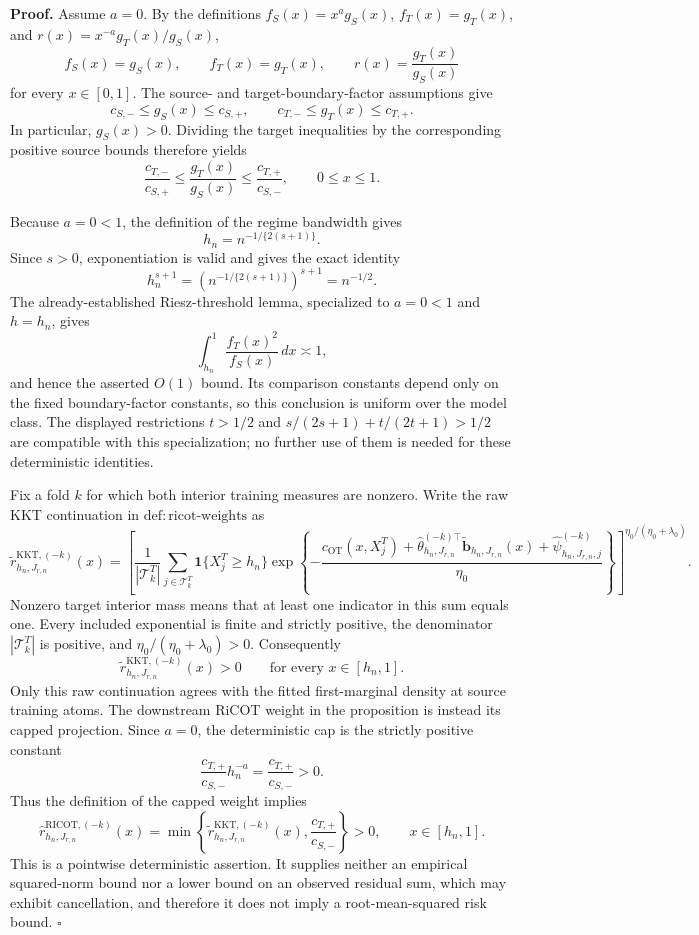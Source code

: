 \textbf{Proof.}
Assume \(a=0\). By the definitions \(f_S(x)=x^a g_S(x)\), \(f_T(x)=g_T(x)\), and \(r(x)=x^{-a}g_T(x)/g_S(x)\),
\[
f_S(x)=g_S(x),\qquad f_T(x)=g_T(x),\qquad r(x)=\frac{g_T(x)}{g_S(x)}
\]
for every \(x\in[0,1]\). The source- and target-boundary-factor assumptions give
\[
c_{S,-}\le g_S(x)\le c_{S,+},
\qquad
c_{T,-}\le g_T(x)\le c_{T,+}.
\]
In particular, \(g_S(x)>0\). Dividing the target inequalities by the corresponding positive source bounds therefore yields
\[
\frac{c_{T,-}}{c_{S,+}}
\le \frac{g_T(x)}{g_S(x)}
\le \frac{c_{T,+}}{c_{S,-}},
\qquad 0\le x\le1.
\]

Because \(a=0<1\), the definition of the regime bandwidth gives
\[
h_n=n^{-1/\{2(s+1)\}}.
\]
Since \(s>0\), exponentiation is valid and gives the exact identity
\[
h_n^{s+1}=\left(n^{-1/\{2(s+1)\}}\right)^{s+1}=n^{-1/2}.
\]
The already-established Riesz-threshold lemma, specialized to \(a=0<1\) and \(h=h_n\), gives
\[
\int_{h_n}^1\frac{f_T(x)^2}{f_S(x)}\,dx\asymp1,
\]
and hence the asserted \(O(1)\) bound. Its comparison constants depend only on the fixed boundary-factor constants, so this conclusion is uniform over the model class. The displayed restrictions \(t>1/2\) and \(s/(2s+1)+t/(2t+1)>1/2\) are compatible with this specialization; no further use of them is needed for these deterministic identities.

Fix a fold \(k\) for which both interior training measures are nonzero. Write the raw KKT continuation in \(\mathrm{def:ricot\text{-}weights}\) as
\[
\widetilde r^{\mathrm{KKT},(-k)}_{h_n,J_{r,n}}(x)
=
\left[
\frac1{|\mathcal T^T_k|}
\sum_{j\in\mathcal T^T_k}
\mathbf 1\{X_j^T\ge h_n\}
\exp\!\left\{-\frac{c_{\mathrm{OT}}(x,X_j^T)
+\widehat\theta_{h_n,J_{r,n}}^{(-k)\top}
\widetilde{\mathbf b}_{h_n,J_{r,n}}(x)
+\widehat\psi^{(-k)}_{h_n,J_{r,n},j}}
{\eta_0}\right\}
\right]^{\eta_0/(\eta_0+\lambda_0)}.
\]
Nonzero target interior mass means that at least one indicator in this sum equals one. Every included exponential is finite and strictly positive, the denominator \(|\mathcal T^T_k|\) is positive, and \(\eta_0/(\eta_0+\lambda_0)>0\). Consequently
\[
\widetilde r^{\mathrm{KKT},(-k)}_{h_n,J_{r,n}}(x)>0
\qquad\text{for every }x\in[h_n,1].
\]
Only this raw continuation agrees with the fitted first-marginal density at source training atoms. The downstream RiCOT weight in the proposition is instead its capped projection. Since \(a=0\), the deterministic cap is the strictly positive constant
\[
\frac{c_{T,+}}{c_{S,-}}h_n^{-a}=\frac{c_{T,+}}{c_{S,-}}>0.
\]
Thus the definition of the capped weight implies
\[
\widehat r^{\mathrm{RICOT},(-k)}_{h_n,J_{r,n}}(x)
=\min\!\left\{
\widetilde r^{\mathrm{KKT},(-k)}_{h_n,J_{r,n}}(x),
\frac{c_{T,+}}{c_{S,-}}
\right\}>0,
\qquad x\in[h_n,1].
\]
This is a pointwise deterministic assertion. It supplies neither an empirical squared-norm bound nor a lower bound on an observed residual sum, which may exhibit cancellation, and therefore it does not imply a root-mean-squared risk bound. \(\square\)